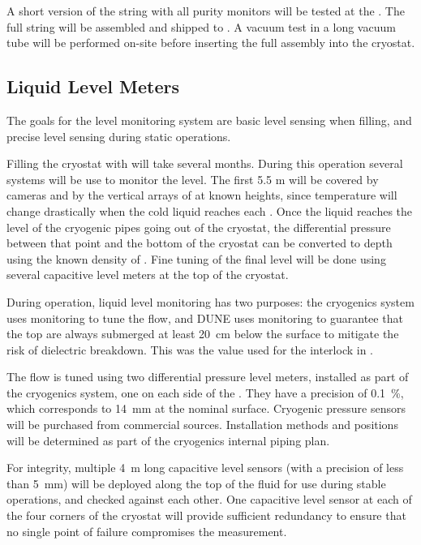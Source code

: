 A short version of the %
string
with all purity monitors will be tested at the .
The full string will be assembled and shipped to \surf. 
 A vacuum test in a long vacuum tube will be performed on-site before inserting the full assembly into the  cryostat. 



\subsection{Liquid Level Meters}

The goals for the  level monitoring system are basic level sensing when filling, and precise level sensing during static operations. 

Filling the cryostat with  will take several months. During this operation several systems will be use to monitor the  level. 
The first 5.5 m will be covered by cameras and by the vertical arrays of  at known heights, since temperature will change drastically 
when the cold liquid reaches each . Once the liquid reaches the level of the cryogenic pipes going out of the cryostat, 
the differential pressure between that point and the bottom of the cryostat
can be converted to depth using
the known density of .   Fine tuning of the final  level will be done using several capacitive level meters at the top of the cryostat. 

During operation, liquid level monitoring has two purposes:
the  cryogenics system uses monitoring to tune the  flow, and 
DUNE uses monitoring to guarantee that the top  are always
submerged 
at least \SI{20}{cm} below the  surface to mitigate the risk of dielectric breakdown. This was the value used for the  interlock in . 

The  flow 
is tuned using two differential pressure level meters, installed as part of the cryogenics system, one on each side of the .  They 
have a precision of \SI{0.1}{\%}, which corresponds to \SI{14}{mm} at the
nominal  surface. Cryogenic pressure sensors will be purchased from commercial sources. Installation methods and positions will be determined as part of the
cryogenics internal piping plan.  

For  integrity, multiple 4~m long capacitive level sensors (with a precision of less than 5~mm) will be deployed along the top of the fluid %
for use during stable operations, and checked against each other.
One capacitive level sensor at each of the four corners of the cryostat will provide sufficient redundancy to ensure that no single point of failure compromises the %
measurement.


